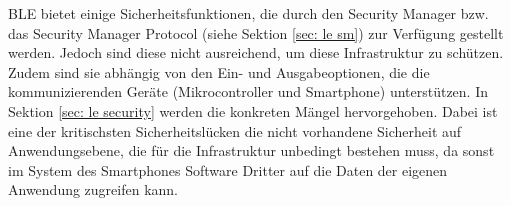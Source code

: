 
BLE bietet einige Sicherheitsfunktionen, die durch den Security Manager bzw. das Security Manager Protocol (siehe Sektion \ref{sec: le sm}) zur Verfügung gestellt werden. Jedoch sind diese nicht ausreichend, um diese Infrastruktur zu schützen. Zudem sind sie abhängig von den Ein- und Ausgabeoptionen, die die kommunizierenden Geräte (Mikrocontroller und Smartphone) unterstützen. In Sektion \ref{sec: le security} werden die konkreten Mängel hervorgehoben. Dabei ist eine der kritischsten Sicherheitslücken die nicht vorhandene Sicherheit auf Anwendungsebene, die für die Infrastruktur unbedingt bestehen muss, da sonst im System des Smartphones Software Dritter auf die Daten der eigenen Anwendung zugreifen kann.
\\\\
